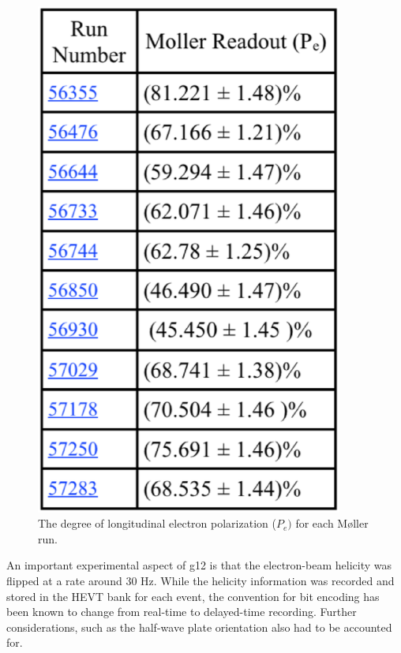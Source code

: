 \begin{figure}[h]
\begin{center}
 \includegraphics[width=0.9\textwidth]{figures/calib/pol/moltable.eps}
  \caption{The degree of longitudinal electron polarization ($P_e)$ for each M{\o}ller run. }
  \label{moltable}
  \end{center}
\end{figure}



An important experimental aspect of g12 is that the electron-beam helicity was flipped at a rate around 30 Hz. While the helicity information was recorded and stored in the HEVT bank for each event, the convention for bit encoding has been known to change from real-time to delayed-time recording. Further considerations, such as the half-wave plate orientation also had to be accounted for.

